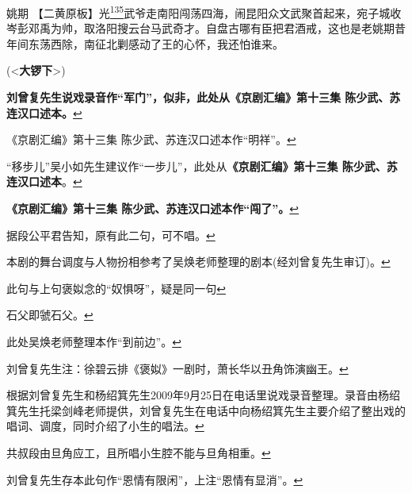 姚期
【二黄原板】光\protect\hyperlink{fn135}{\textsuperscript{135}}武爷走南阳闯荡四海，闹昆阳众文武聚首起来，宛子城收岑彭邓禹为帅，取洛阳搜云台马武奇才。自盘古哪有臣把君酒戒，这也是老姚期昔年间东荡西除，南征北剿感动了王的心怀，我还怕谁来。

(\textless{}\textbf{大锣下}\textgreater{})


\item
  \leavevmode\hypertarget{fn3}{}%
  \textbf{刘曾复先生说戏录音作``军门''，似非，此处从《京剧汇编》第十三集
  陈少武、苏连汉口述本。}\protect\hyperlink{fnref3}{↩}
\item
  \leavevmode\hypertarget{fn4}{}%
  《京剧汇编》第十三集
  陈少武、苏连汉口述本作``明祥''。\protect\hyperlink{fnref4}{↩}
\item
  \leavevmode\hypertarget{fn5}{}%
  ``移步儿''吴小如先生建议作``一步儿''，此处从\textbf{《京剧汇编》第十三集
  陈少武、苏连汉口述本}。\protect\hyperlink{fnref5}{↩}
\item
  \leavevmode\hypertarget{fn6}{}%
  \textbf{《京剧汇编》第十三集
  陈少武、苏连汉口述本作``闯了''。}\protect\hyperlink{fnref6}{↩}
\item
  \leavevmode\hypertarget{fn7}{}%
  据段公平君告知，原有此二句，可不唱。\protect\hyperlink{fnref7}{↩}
\item
  \leavevmode\hypertarget{fn8}{}%
  本剧的舞台调度与人物扮相参考了吴焕老师整理的剧本(经刘曾复先生审订)。\protect\hyperlink{fnref8}{↩}
\item
  \leavevmode\hypertarget{fn9}{}%
  此句与上句褒姒念的``奴惧呀''，疑是同一句\protect\hyperlink{fnref9}{↩}
\item
  \leavevmode\hypertarget{fn10}{}%
  石父即虢石父。\protect\hyperlink{fnref10}{↩}
\item
  \leavevmode\hypertarget{fn11}{}%
  此处吴焕老师整理本作``到前边''。\protect\hyperlink{fnref11}{↩}
\item
  \leavevmode\hypertarget{fn12}{}%
  刘曾复先生注：徐碧云排《褒姒》一剧时，萧长华以丑角饰演幽王。\protect\hyperlink{fnref12}{↩}
\item
  \leavevmode\hypertarget{fn13}{}%
  根据刘曾复先生和杨绍箕先生2009年9月25日在电话里说戏录音整理。录音由杨绍箕先生托梁剑峰老师提供，刘曾复先生在电话中向杨绍箕先生主要介绍了整出戏的唱词、调度，同时介绍了小生的唱法。\protect\hyperlink{fnref13}{↩}
\item
  \leavevmode\hypertarget{fn14}{}%
  共叔段由旦角应工，且所唱小生腔不能与旦角相重。\protect\hyperlink{fnref14}{↩}
\item
  \leavevmode\hypertarget{fn15}{}%
  刘曾复先生存本此句作``恩情有限闲''，上注``恩情有显消''。\protect\hyperlink{fnref15}{↩}

